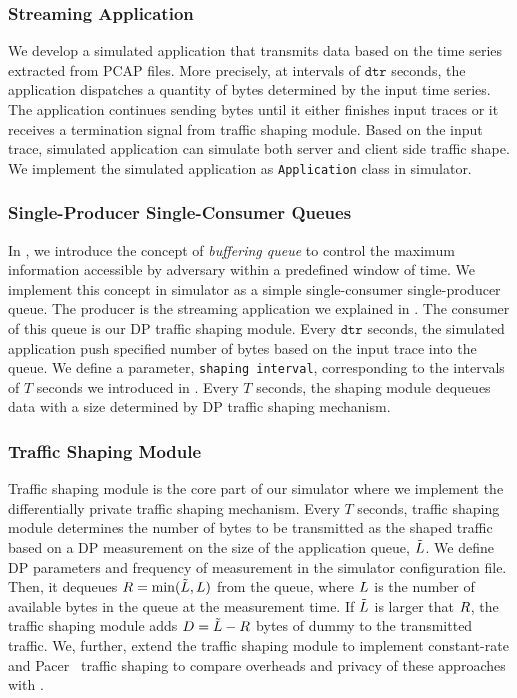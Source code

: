 \subsubsection{Streaming Application}\label{subsubsec:design-simulator-app}
We develop a simulated application that transmits data based on the time series extracted from PCAP files. 
More precisely, at intervals of $\texttt{dtr}$ seconds, the application dispatches a quantity of bytes determined by the input time series.
The application continues sending bytes until it either finishes input traces or it receives a termination signal from traffic shaping module.
Based on the input trace, simulated application can simulate both server and client side traffic shape.
We implement the simulated application as \texttt{Application} class in simulator.

\subsubsection{Single-Producer Single-Consumer Queues}\label{subsubsec:design-sim-spsc-queue}
In , we introduce the concept of \textit{buffering queue} to control the maximum information accessible by adversary within a predefined window of time.
We implement this concept in simulator as a simple single-consumer single-producer queue.
The producer is the streaming application we explained in .
The consumer of this queue is our DP traffic shaping module.
Every $\texttt{dtr}$ seconds, the simulated application push specified number of bytes based on the input trace into the queue.
We define a parameter, \texttt{shaping interval}, corresponding to the intervals of $T$ seconds we introduced in .
Every $T$ seconds, the shaping module dequeues data with a size determined by
DP traffic shaping mechanism.



\subsubsection{Traffic Shaping Module}
Traffic shaping module is the core part of our simulator where we implement the differentially private traffic shaping mechanism.
Every $T$ seconds, traffic shaping module determines the number of bytes to be transmitted as the shaped traffic based on a DP measurement on the size of the application queue, $\tilde{L}$.
We define DP parameters and frequency of measurement in the simulator configuration file. 
Then, it dequeues $R = \min(\tilde{L}, L)$ from the queue, where $L$ is the number of available bytes in the queue at the measurement time. 
If $\tilde{L}$ is larger that $R$, the traffic shaping module adds $D = \tilde{L} - R$ bytes of dummy to the transmitted traffic.
We, further, extend the traffic shaping module to implement constant-rate and Pacer~\cite{mehta2022pacer} traffic shaping to compare overheads and privacy of these approaches with {\sys}. 



